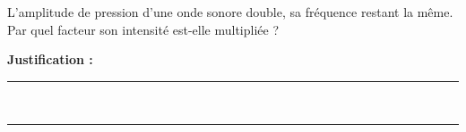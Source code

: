 L'amplitude de pression d'une onde sonore double, sa fréquence restant la même. Par quel facteur son intensité est-elle multipliée ?

\choices

\noindent\textbf{Justification :} \hrulefill \\[2.5ex]
\rule{\linewidth}{0.4pt} \\[2.5ex]
\rule{\linewidth}{0.4pt}
\vfill
